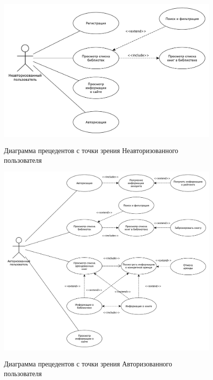 \begin{figure}[H]
	\begin{center}
		{\includegraphics[scale = 0.5]{../img/use-case/non-auth-user.pdf}}
		\caption{Диаграмма прецедентов с точки зрения Неавторизованного пользователя}
		\label{fig:use-case-non-auth}
	\end{center}
\end{figure}

\begin{figure}[H]
	\begin{center}
		{\includegraphics[scale = 0.4]{../img/use-case/auth-user.pdf}}
		\caption{Диаграмма прецедентов с точки зрения Авторизованного пользователя}
		\label{fig:use-case-auth}
	\end{center}
\end{figure}


